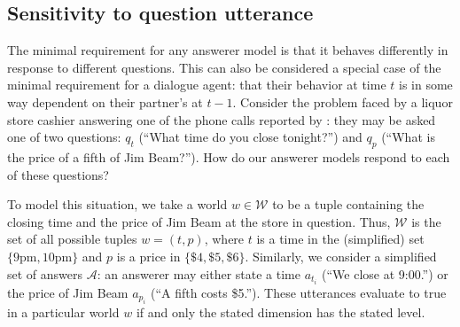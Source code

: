 \documentclass[11pt, floatsintext]{apa6}
\begin{document}

\subsection{Sensitivity to question utterance}

The minimal requirement for any answerer model is that it behaves differently in response to different questions. This can also be considered a special case of the minimal requirement for a dialogue agent: that their behavior at time $t$ is in some way dependent on their partner's at $t-1$. %
Consider the problem faced by a liquor store cashier answering one of the phone calls reported by : they may be asked one of two questions: $q_t$ (``What time do you close tonight?'') and $q_p$ (``What is the price of a fifth of Jim Beam?''). How do our answerer models respond to each of these questions?

To model this situation, we take a world $w \in \mathcal{W}$ to be a tuple containing the closing time and the price of Jim Beam at the store in question. Thus, $\mathcal{W}$ is the set of all possible tuples $w = (t, p)$, where $t$ is a time in the (simplified) set $\{9\textrm{pm},10\textrm{pm}\}$ and $p$ is a price in $\{\$4, \$5, \$6\}$. Similarly, we consider a simplified set of answers $\mathcal{A}$: an answerer may either state a time $a_{t_i}$ (``We close at 9:00.'') or the price of Jim Beam $a_{p_i}$  (``A fifth costs \$5.''). These utterances evaluate to true in a particular world $w$ if and only the stated dimension has the stated level.
\end{document}
